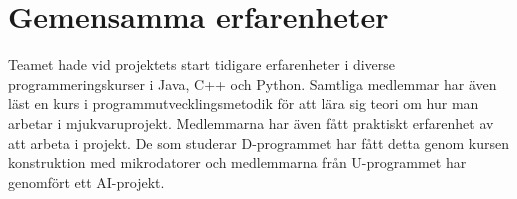 \section{Gemensamma erfarenheter}
Teamet hade vid projektets start tidigare erfarenheter i diverse programmeringskurser i Java, C++ och Python. 
Samtliga medlemmar har även läst en kurs i programmutvecklingsmetodik för att lära sig teori om hur man arbetar i mjukvaruprojekt. 
Medlemmarna har även fått praktiskt erfarenhet av att arbeta i projekt. De som studerar D-programmet har fått detta genom kursen konstruktion med mikrodatorer och medlemmarna från U-programmet har genomfört ett AI-projekt.
